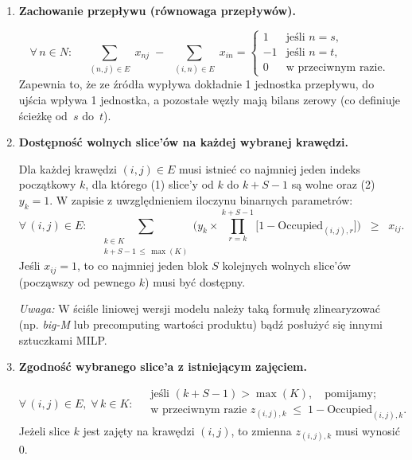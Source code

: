 \documentclass[12pt]{article}
\begin{document}
\begin{enumerate}
	\item \textbf{Zachowanie przepływu (równowaga przepływów).}

	      \[
		      \forall\, n \in N: \quad
		      \sum_{\substack{(n,j)\in E}} x_{n j}
		      \;-\;
		      \sum_{\substack{(i,n)\in E}} x_{i n}
		      =
		      \begin{cases}
			      1  & \text{jeśli } n = s,       \\
			      -1 & \text{jeśli } n = t,       \\
			      0  & \text{w przeciwnym razie}.
		      \end{cases}
	      \]
	      Zapewnia to, że ze źródła wypływa dokładnie 1 jednostka przepływu, do ujścia wpływa 1 jednostka, a pozostałe węzły mają bilans zerowy (co definiuje ścieżkę od \(\,s\) do \(\,t\)).

	      \vspace{1em}

	\item \textbf{Dostępność wolnych slice'ów na każdej wybranej krawędzi.}

	      Dla każdej krawędzi \((i,j)\in E\) musi istnieć co najmniej jeden indeks początkowy \(k\), dla którego (1) slice'y od \(k\) do \(k+S-1\) są wolne oraz (2) \(y_k=1\). W zapisie z uwzględnieniem iloczynu binarnych parametrów:
	      \[
		      \forall\,(i,j) \in E:\quad
		      \sum_{\substack{k \in K \\ k + S - 1 \,\le\, \max(K)}}
		      \Biggl(
		      y_k \times
		      \prod_{r = k}^{k + S - 1} \bigl[1 - \text{Occupied}_{(i,j),r}\bigr]
		      \Biggr)
		      \;\;\ge\;\; x_{ij}.
	      \]
	      Jeśli \(x_{ij} = 1\), to co najmniej jeden blok \(S\) kolejnych wolnych slice'ów (począwszy od pewnego \(k\)) musi być dostępny.

	      \emph{Uwaga:} W ściśle liniowej wersji modelu należy taką formułę zlinearyzować (np. \emph{big-M} lub precomputing wartości produktu) bądź posłużyć się innymi sztuczkami MILP.

	      \vspace{1em}

	\item \textbf{Zgodność wybranego slice'a z istniejącym zajęciem.}

	      \[
		      \forall\,(i,j)\in E,\;\forall\,k \in K: \;
		      \begin{aligned}
			       & \text{jeśli }(k + S - 1) > \max(K),\quad \text{pomijamy;}                     \\
			       & \text{w przeciwnym razie } z_{(i,j),k} \;\le\; 1 - \text{Occupied}_{(i,j),k}.
		      \end{aligned}
	      \]
	      Jeżeli slice \(k\) jest zajęty na krawędzi \((i,j)\), to zmienna \(z_{(i,j),k}\) musi wynosić 0.


\end{enumerate}
\end{document}
